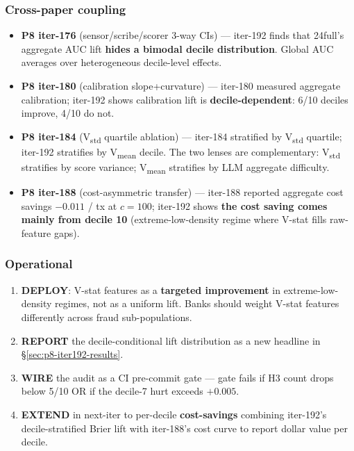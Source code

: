 \subsubsection{Cross-paper coupling}\label{sec:p8-iter192-coupling}

\begin{itemize}
\item \textbf{P8 iter-176} (sensor/scribe/scorer 3-way CIs) --- iter-192
  finds that 24full's aggregate AUC lift \textbf{hides a bimodal decile
  distribution}. Global AUC averages over heterogeneous decile-level
  effects.
\item \textbf{P8 iter-180} (calibration slope+curvature) --- iter-180
  measured aggregate calibration; iter-192 shows calibration lift is
  \textbf{decile-dependent}: 6/10 deciles improve, 4/10 do not.
\item \textbf{P8 iter-184} (V\textsubscript{std} quartile ablation) ---
  iter-184 stratified by V\textsubscript{std} quartile; iter-192
  stratifies by V\textsubscript{mean} decile. The two lenses are
  complementary: V\textsubscript{std} stratifies by score variance;
  V\textsubscript{mean} stratifies by LLM aggregate difficulty.
\item \textbf{P8 iter-188} (cost-asymmetric transfer) --- iter-188 reported
  aggregate cost savings $-0.011$ / tx at $c{=}100$; iter-192 shows
  \textbf{the cost saving comes mainly from decile 10} (extreme-low-density
  regime where V-stat fills raw-feature gaps).
\end{itemize}

\subsubsection{Operational}\label{sec:p8-iter192-operational}
\begin{enumerate}
\item \textbf{DEPLOY}: V-stat features as a \textbf{targeted improvement}
  in extreme-low-density regimes, not as a uniform lift. Banks should
  weight V-stat features differently across fraud sub-populations.
\item \textbf{REPORT} the decile-conditional lift distribution as a new
  headline in §\ref{sec:p8-iter192-results}.
\item \textbf{WIRE} the audit as a CI pre-commit gate --- gate fails if
  H3 count drops below 5/10 OR if the decile-7 hurt exceeds $+0.005$.
\item \textbf{EXTEND} in next-iter to per-decile \textbf{cost-savings}
  combining iter-192's decile-stratified Brier lift with iter-188's
  cost curve to report dollar value per decile.
\end{enumerate}